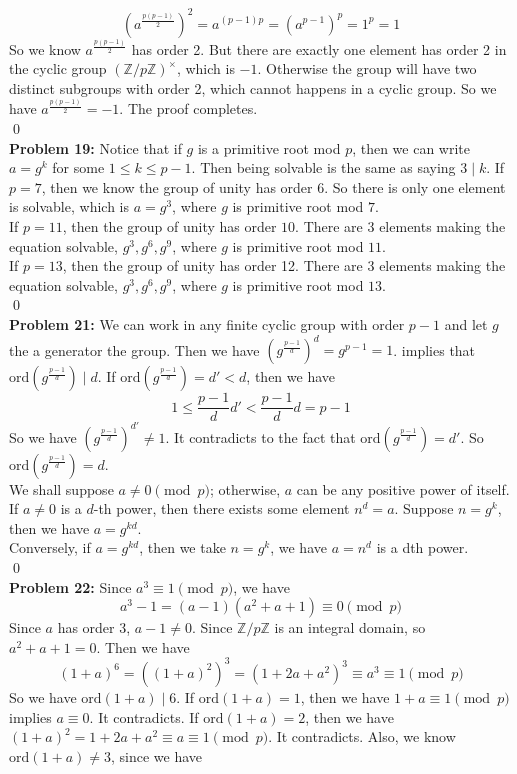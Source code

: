 \documentclass[12pt]{amsart}
\newcommand{\Z}{\mathbb{Z}}
\newcommand{\ord}{\mathrm{ord}}
\begin{document}
\[(a^{\frac{p(p-1)}{2}})^2=a^{(p-1)p}=(a^{p-1})^p=1^p=1\]
So we know $a^{\frac{p(p-1)}{2}}$ has order 2. But there are exactly one element has order 2 in the cyclic group $(\Z/p\Z)^\times $, which is $-1$. Otherwise the group will have two distinct subgroups with order 2, which cannot happens in a cyclic group. So we have $a^{\frac{p(p-1)}{2}}=-1$. The proof completes.
\\\qed\\
\textbf{Problem 19:} Notice that if $g$ is a primitive root mod $p$, then we can write $a=g^k$ for some $1\leq k\leq p-1$. Then being solvable is the same as saying $3\mid k$.
If $p=7$, then we know the group of unity has order 6. So there is only one element is solvable, which is $a=g^3$, where $g$ is primitive root mod $7$.\\
If $p=11$, then the group of unity has order $10$. There are 3 elements making the equation solvable, $g^3,g^6,g^9$, where $g$ is primitive root mod $11$.\\
If $p=13$, then the group of unity has order 12. There are 3 elements making the equation solvable, $g^3,g^6,g^9$, where $g$ is primitive root mod $13$.\\
\qed\\
\textbf{Problem 21:} We can work in any finite cyclic group with order $p-1$ and let $g$ the a generator the group. Then we have $(g^{\frac{p-1}{d}})^d=g^{p-1}=1$. implies that $\ord(g^{\frac{p-1}{d}})\mid d$. If $\ord(g^{\frac{p-1}{d}})=d'< d$, then we have 
\[1\leq \frac{p-1}{d}d'<\frac{p-1}{d}d=p-1\]
So we have $(g^{\frac{p-1}{d}})^{d'}\neq 1$. It contradicts to the fact that $\ord(g^{\frac{p-1}{d}})=d'$. So $\ord(g^{\frac{p-1}{d}})=d$.\\
We shall suppose $a\neq 0\pmod p$; otherwise, $a$ can be any positive power of itself. If $a\neq 0$ is a $d$-th power, then there exists some element $n^d=a$. Suppose $n=g^k$, then 
we have $a=g^{kd}$.\\ Conversely, if $a= g^{kd }$, then we take $n=g^k$, we have $a=n^d$ is a dth power.\\\qed\\
\textbf{Problem 22:} Since $a^3\equiv 1\pmod p$, we have 
\[a^3-1=(a-1)(a^2+a+1)\equiv 0\pmod p\]
Since $a$ has order 3, $a-1\neq 0$. Since $\Z/p\Z$ is an integral domain, so $a^2+a+1=0$.
Then we have 
\[(1+a)^6=((1+a)^2)^3=(1+2a+a^2)^3\equiv a^3\equiv 1\pmod p\]
So we have $\ord(1+a)\mid 6$. If $\ord(1+a)=1$, then we have $1+a\equiv 1\pmod p$ implies $a\equiv 0$. It contradicts. If $\ord(1+a)=2$, then we have $(1+a)^2=1+2a+a^2\equiv a\equiv 1\pmod p$. It contradicts. Also, we know $\ord(1+a)\neq 3$, since we have 
\end{document}
